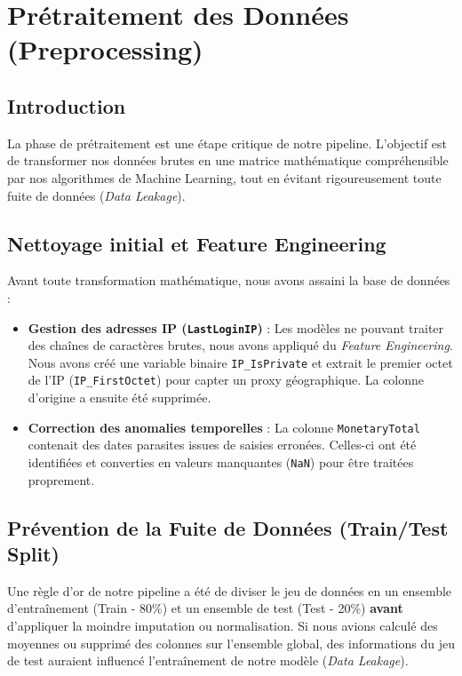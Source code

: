 \section{Prétraitement des Données (Preprocessing)}

\subsection{Introduction}
La phase de prétraitement est une étape critique de notre pipeline. L'objectif est de transformer nos données brutes en une matrice mathématique compréhensible par nos algorithmes de Machine Learning, tout en évitant rigoureusement toute fuite de données (\textit{Data Leakage}).

\subsection{Nettoyage initial et Feature Engineering}
Avant toute transformation mathématique, nous avons assaini la base de données :
\begin{itemize}
	\item \textbf{Gestion des adresses IP (\texttt{LastLoginIP})} : Les modèles ne pouvant traiter des chaînes de caractères brutes, nous avons appliqué du \textit{Feature Engineering}. Nous avons créé une variable binaire \texttt{IP\_IsPrivate} et extrait le premier octet de l'IP (\texttt{IP\_FirstOctet}) pour capter un proxy géographique. La colonne d'origine a ensuite été supprimée.
	\item \textbf{Correction des anomalies temporelles} : La colonne \texttt{MonetaryTotal} contenait des dates parasites issues de saisies erronées. Celles-ci ont été identifiées et converties en valeurs manquantes (\texttt{NaN}) pour être traitées proprement.
\end{itemize}

\subsection{Prévention de la Fuite de Données (Train/Test Split)}

\begin{tcolorbox}[title=Justification de la Séparation]
	Une règle d'or de notre pipeline a été de diviser le jeu de données en un ensemble d'entraînement (Train - 80\%) et un ensemble de test (Test - 20\%) \textbf{avant} d'appliquer la moindre imputation ou normalisation. Si nous avions calculé des moyennes ou supprimé des colonnes sur l'ensemble global, des informations du jeu de test auraient influencé l'entraînement de notre modèle (\textit{Data Leakage}).
\end{tcolorbox}

